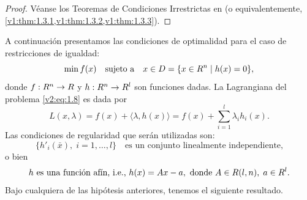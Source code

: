\begin{proof}
    Véanse los Teoremas de Condiciones Irrestrictas en \cite{izmailov2020otimizacaovolume1} (o equivalentemente, \cref{v1:thm:1.3.1,v1:thm:1.3.2,v1:thm:1.3.3}).
\end{proof}

A continuación presentamos las condiciones de optimalidad para el caso de restricciones de igualdad:
\begin{equation}
    \min f(x) \quad \text{sujeto a} \quad x \in D = \{ x \in R^n \mid h(x) = 0 \},
    \label{v2:eq:1.8}
\end{equation}
donde $f : R^n \to R$ y $h : R^n \to R^l$ son funciones dadas. La Lagrangiana del problema \eqref{v2:eq:1.8} es dada por
\[
    L(x, \lambda) = f(x) + \langle \lambda, h(x) \rangle = f(x) + \sum_{i=1}^l \lambda_i h_i(x).
\]
Las condiciones de regularidad que serán utilizadas son:
\begin{equation}
    \{h'_i(\bar{x}), \; i = 1, \dots, l\} \quad \text{es un conjunto linealmente independiente,}
    \label{v2:eq:1.9}
\end{equation}
o bien
\begin{equation}
    h \text{ es una función afín, i.e., } h(x) = Ax - a, \text{ donde } A \in R(l, n), \; a \in R^l.
    \label{v2:eq:1.10}
\end{equation}
Bajo cualquiera de las hipótesis anteriores, tenemos el siguiente resultado.


